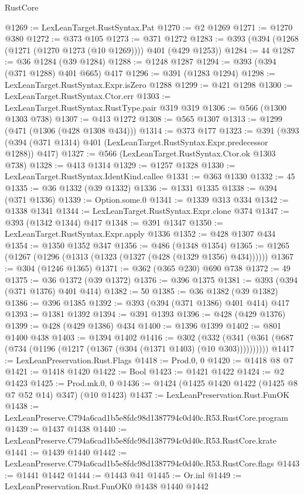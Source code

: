 \begin{lexlean}{RustCore}
\begin{coremodule}
@1269 := LexLeanTarget.RustSyntax.Pat
@1270 := @2 @1269
@1271 := @1270 @380
@1272 := @373 @105
@1273 := @371 @1272
@1283 := @393 (@394 (@1268 (@1271 (@1270 @1273 (@10 @1269)))) @401 (@429 @1253))
@1284 := 44
@1287 := @36 @1284 (@39 @1284)
@1288 := @1248 @1287
@1294 := @393 (@394 (@371 @1288) @401 @665) @417
@1296 := @391 (@1283 @1294)
@1298 := LexLeanTarget.RustSyntax.Expr.isZero @1288
@1299 := @421 @1298
@1300 := LexLeanTarget.RustSyntax.Ctor.err
@1303 := LexLeanTarget.RustSyntax.RustType.pair @319 @319
@1306 := @566 (@1300 @1303 @738)
@1307 := @413 @1272
@1308 := @565 @1307
@1313 := @1299 (@471 (@1306 (@428 @1308 @434)))
@1314 := @373 @177
@1323 := @391 (@393 (@394 (@371 @1314) @401 (LexLeanTarget.RustSyntax.Expr.predecessor @1288)) @417)
@1327 := @566 (LexLeanTarget.RustSyntax.Ctor.ok @1303 @738)
@1328 := @413 @1314
@1329 := @1257 @1328
@1330 := LexLeanTarget.RustSyntax.IdentKind.callee
@1331 := @363 @1330
@1332 := 45
@1335 := @36 @1332 (@39 @1332)
@1336 := @1331 @1335
@1338 := @394 (@371 @1336)
@1339 := Option.some.{0}
@1341 := @1339 @313 @334
@1342 := @1338 @1341
@1344 := LexLeanTarget.RustSyntax.Expr.clone @374
@1347 := @393 (@1342 @1344) @417
@1348 := @391 @1347
@1350 := LexLeanTarget.RustSyntax.Expr.apply @1336
@1352 := @428 @1307 @434
@1354 := @1350 @1352 @347
@1356 := @486 (@1348 @1354)
@1365 := @1265 (@1267 (@1296 (@1313 (@1323 (@1327 (@428 (@1329 @1356) @434))))))
@1367 := @304 (@1246 @1365)
@1371 := @362 (@365 @230) @690 @738
@1372 := 49
@1375 := @36 @1372 (@39 @1372)
@1376 := @396 @1375
@1381 := @393 (@394 (@371 @1376) @401 @414)
@1382 := 50
@1385 := @36 @1382 (@39 @1382)
@1386 := @396 @1385
@1392 := @393 (@394 (@371 @1386) @401 @414) @417
@1393 := @1381 @1392
@1394 := @391 @1393
@1396 := @428 (@429 @1376)
@1399 := @428 (@429 @1386) @434
@1400 := @1396 @1399
@1402 := @801 @1400 @438
@1403 := @1394 @1402
@1416 := @302
    (@332 (@341 (@361 (@687 (@734 (@1196 (@1217 (@1367 (@304 (@1371 @1403) (@10 @303))))))))))
@1417 := LexLeanPreservation.Rust.Flags
@1418 := Prod.{0, 0}
@1420 := @1418 @8 @7
@1421 := @1418 @1420
@1422 := Bool
@1423 := @1421 @1422
@1424 := @2 @1423
@1425 := Prod.mk.{0, 0}
@1436 := @1424 (@1425 @1420 @1422 (@1425 @8 @7 @52 @14) @347) (@10 @1423)
@1437 := LexLeanPreservation.Rust.FunOK
@1438 := LexLeanPreserve.C794a6cad1b5e8fdc98d1387794c0d40c.R53.RustCore.program
@1439 := @1437 @1438
@1440 := LexLeanPreserve.C794a6cad1b5e8fdc98d1387794c0d40c.R53.RustCore.krate
@1441 := @1439 @1440
@1442 := LexLeanPreserve.C794a6cad1b5e8fdc98d1387794c0d40c.R53.RustCore.flags
@1443 := @1441 @1442
@1444 := @1443 @41
@1445 := Or.inl
@1449 := LexLeanPreservation.Rust.FunOK0 @1438 @1440 @1442

\end{coremodule}
\end{lexlean}
